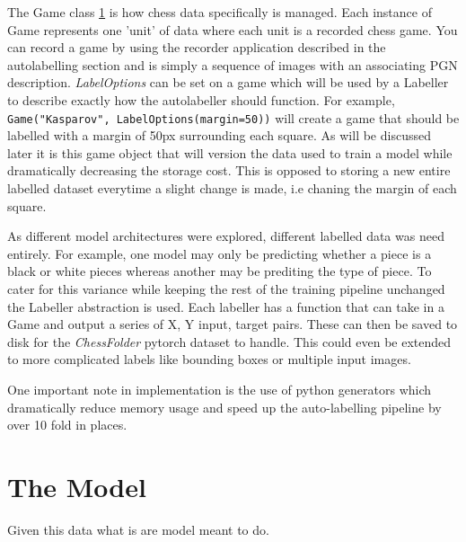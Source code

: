 The Game class \ref{} is how chess data specifically is managed.  Each instance of Game represents one 'unit' of data where each unit is a recorded chess game.
You can record a game by using the recorder application described in the autolabelling section and is simply a sequence of images with
an associating PGN description. \textit{LabelOptions} can be set on a game which will be used by a Labeller to describe exactly how the autolabeller 
should function.  For example, \verb|Game("Kasparov", LabelOptions(margin=50))| will create a game that should be labelled
with a margin of 50px surrounding each square.  As will be discussed later it is this game object that will version the data used to train a model while dramatically
decreasing the storage cost.  This is opposed to storing a new entire labelled dataset everytime a slight change is made, i.e chaning the margin of each square.

As different model architectures were explored, different labelled data was need entirely.  For example, one model may only be 
predicting whether a piece is a black or white pieces whereas another may be prediting the type of piece.  To cater for this variance while keeping the rest of the 
training pipeline unchanged the Labeller abstraction is used.  Each labeller has a function that can take in a Game and output a series of X, Y input, target pairs.
These can then be saved to disk for the \textit{ChessFolder} pytorch dataset to handle. 
This could even be extended to more complicated labels like bounding boxes or multiple input images.

One important note in implementation is the use of python generators which dramatically reduce memory usage and speed up the auto-labelling pipeline by over 10 fold in 
places.

\section{The Model}
Given this data what is are model meant to do.

